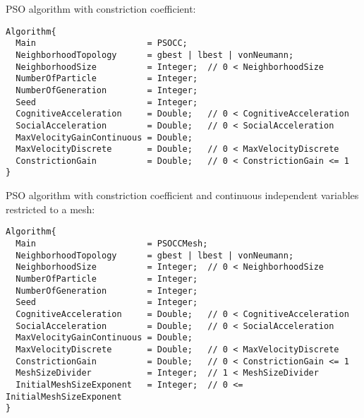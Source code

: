 \noindent
PSO algorithm with constriction coefficient:
\begin{lstlisting}
Algorithm{
  Main                      = PSOCC;
  NeighborhoodTopology      = gbest | lbest | vonNeumann;
  NeighborhoodSize          = Integer;  // 0 < NeighborhoodSize
  NumberOfParticle          = Integer;
  NumberOfGeneration        = Integer;
  Seed                      = Integer;
  CognitiveAcceleration     = Double;   // 0 < CognitiveAcceleration
  SocialAcceleration        = Double;   // 0 < SocialAcceleration
  MaxVelocityGainContinuous = Double;
  MaxVelocityDiscrete       = Double;   // 0 < MaxVelocityDiscrete
  ConstrictionGain          = Double;   // 0 < ConstrictionGain <= 1
}
\end{lstlisting}

\noindent
PSO algorithm with constriction coefficient and 
continuous independent variables
restricted to a mesh:
\label{algSec:PSOCCMesh}
\begin{lstlisting}
Algorithm{
  Main                      = PSOCCMesh;
  NeighborhoodTopology      = gbest | lbest | vonNeumann;
  NeighborhoodSize          = Integer;  // 0 < NeighborhoodSize
  NumberOfParticle          = Integer;
  NumberOfGeneration        = Integer;
  Seed                      = Integer;
  CognitiveAcceleration     = Double;   // 0 < CognitiveAcceleration
  SocialAcceleration        = Double;   // 0 < SocialAcceleration
  MaxVelocityGainContinuous = Double;
  MaxVelocityDiscrete       = Double;   // 0 < MaxVelocityDiscrete
  ConstrictionGain          = Double;   // 0 < ConstrictionGain <= 1
  MeshSizeDivider           = Integer;  // 1 < MeshSizeDivider
  InitialMeshSizeExponent   = Integer;  // 0 <= InitialMeshSizeExponent
}
\end{lstlisting}


